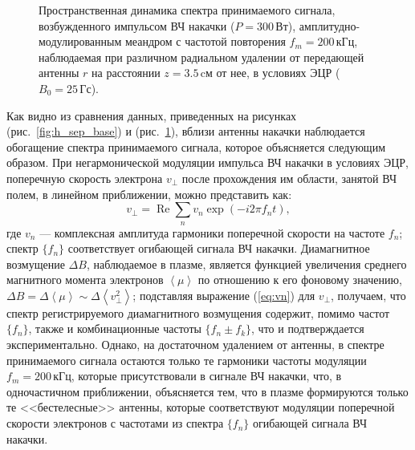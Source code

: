 \documentclass[autoref,10pt]{disser}
\renewcommand\Re{\operatorname{Re}}
\begin{document}
\begin{figure}
   \centering
   \def\svgwidth{0.7\columnwidth} %
   
   \vspace{1.0cm}
   \caption{Пространственная динамика спектра принимаемого сигнала, возбужденного импульсом ВЧ накачки ($P=300$\,Вт),  амплитудно-мо\-ду\-ли\-ро\-ван\-ным меандром с частотой повторения $f_m=200$\,кГц, наблюдаемая при различном радиальном удалении от передающей антенны $r$ на расстоянии $z=3.5$\,cм от нее, в условиях ЭЦР ($B_0 = 25$\,Гс).}
   \label{fig:h_sep}
\end{figure}

Как видно из сравнения данных, приведенных на рисунках (\mbox{рис.~\ref{fig:h_sep_base}}) и (\mbox{рис.~\ref{fig:h_sep}}), вблизи антенны накачки наблюдается обогащение спектра принимаемого сигнала, которое объясняется следующим образом. При негармонической модуляции импульса ВЧ накачки в условиях ЭЦР, поперечную скорость электрона $v_\perp$ после прохождения им области, занятой ВЧ полем, в линейном приближении, можно представить как: 
\begin{equation}
v_\perp=\Re{}{\sum_{n} v_n\exp(-i2\pi{}f_nt)},
\label{eq:vn}
\end{equation} 
где $v_n$ --- комплексная амплитуда гармоники поперечной скорости на частоте $f_n$; спектр $\{f_n\}$ соответствует огибающей сигнала ВЧ накачки. Диамагнитное возмущение $\Delta{}B$, наблюдаемое в плазме, является функцией увеличения среднего магнитного момента электронов $\left<\mu\right>$ по отношению к его фоновому значению, $\Delta{}B=\Delta\left<\mu\right>\sim{}\Delta{}\left<v_\perp^2\right>$; подставляя выражение (\ref{eq:vn}) для $v_\perp$, получаем, что спектр регистрируемого диамагнитного возмущения содержит, помимо частот $\{f_n\}$, также и комбинационные частоты $\{f_n\pm{}f_k\}$, что и подтверждается экспериментально. Однако, на достаточном удалением от антенны, в спектре принимаемого сигнала остаются только те гармоники частоты модуляции $f_m=200$\,кГц, которые присутствовали в сигнале ВЧ накачки, что, в одночастичном приближении, объясняется тем, что в плазме формируются только те <<бестелесные>> антенны, которые соответствуют модуляции поперечной скорости электронов с частотами из спектра  $\{f_n\}$ огибающей сигнала ВЧ накачки.
\end{document}
